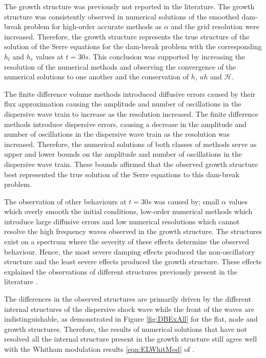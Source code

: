 The growth structure was previously not reported in the literature. The growth structure was consistently observed in numerical solutions of the smoothed dam-break problem for high-order accurate methods as $\alpha$ and the grid resolution were increased. Therefore, the growth structure represents the true structure of the solution of the Serre equations for the dam-break problem with the corresponding $h_l$ and $h_r$ values at $t=30s$. This conclusion was supported by increasing the resolution of the numerical methods and observing the convergence of the numerical solutions to one another and the conservation of $h$, $uh$ and $\mathcal{H}$. 

The finite difference volume methods introduced diffusive errors caused by their flux approximation causing the amplitude and number of oscillations in the dispersive wave train to increase as the resolution increased. The finite difference methods introduce dispersive errors, causing a decrease in the amplitude and number of oscillations in the dispersive wave train as the resolution was increased. Therefore, the numerical solutions of both classes of methods serve as upper and lower bounds on the amplitude and number of oscillations in the dispersive wave train. These bounds affirmed that the observed growth structure best represented the true solution of the Serre equations to this dam-break problem. 

The observation of other behaviours at $t=30s$ was caused by; small $\alpha$ values which overly smooth the initial conditions, low-order numerical methods which introduce large diffusive errors and low numerical resolutions which cannot resolve the high frequency waves observed in the growth structure. The structures exist on a spectrum where the severity of these effects determine the observed behaviour. Hence, the most severe damping effects produced the non-oscillatory structure and the least severe effects produced the growth structure. These effects explained the observations of different structures previously present in the literature \cite{El-etal-2006,Hank-etal-2010-2034,Mitsotakis-etal-2014,Mitsotakis-etal-2017}. 

The differences in the observed structures are primarily driven by the different internal structures of the dispersive shock wave while the front of the waves are indistinguishable, as demonstrated in Figure \ref{fig:DBExAll} for the flat, node and growth structures. Therefore, the results of numerical solutions that have not resolved all the internal structure present in the growth structure still agree well with the Whitham modulation results \eqref{eqn:ELWhitMod} of \citet{El-etal-2006}.

